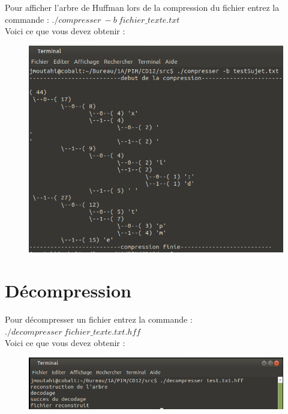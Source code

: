 \documentclass[frenchb]{article}
\begin{document}
	Pour afficher l'arbre de Huffman lors de la compression du fichier entrez la commande : $./compresser \ -b \ fichier\_texte.txt$\\
	Voici ce que vous devez obtenir :
	\begin{figure}[ht!]
		\centering
		\includegraphics[scale=0.7]{compressionBavarde.png} 
	\end{figure}


\newpage
\section{Décompression}
Pour décompresser un fichier entrez la commande : $./decompresser \ fichier\_texte.txt.hff$\\
Voici ce que vous devez obtenir :
	\begin{figure}[ht!]
		\centering
		\includegraphics[scale=0.7]{decompression.png} 
	\end{figure}
\end{document}
